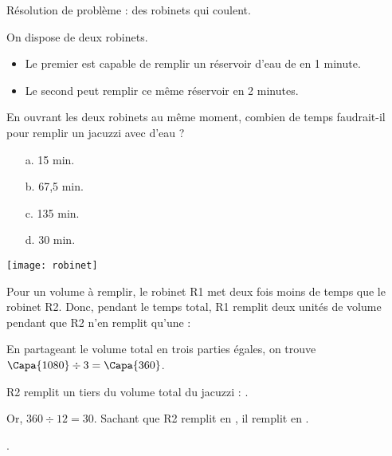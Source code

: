 \begin{Maquette}[Fiche,CorrigeFin,Colonnes=2]{}
\begin{multicols}{2}
      
      \begin{exercice}[Dur] %
         Résolution de problème : des robinets qui coulent. \par
         On dispose de deux robinets.
         \begin{itemize}
            \item Le premier est capable de remplir un réservoir d’eau de  en 1 minute.
            \item Le second peut remplir ce même réservoir en 2 minutes.
         \end{itemize}
         En ouvrant les deux robinets au même moment, combien de temps faudrait-il pour remplir un jacuzzi avec  d’eau ? \par
         \begin{minipage}{4cm}
            \begin{enumerate}
               \item[a.] 15 min.
               \item[b.] 67,5 min.
               \item[c.] 135 min.
               \item[d.] 30 min.
            \end{enumerate}
         \end{minipage}
         \begin{minipage}{2cm}
            \texttt{[image: robinet]}
         \end{minipage}
      \end{exercice}
      
      \begin{Solution}
         Pour un volume à remplir, le robinet R1 met deux fois moins de temps que le robinet R2. Donc, pendant le temps total, R1 remplit deux \og unités de volume \fg{} pendant que R2 n'en remplit qu’une : \par \smallskip
          \par
         En partageant le volume total en trois parties égales, on trouve $\Capa{1080}\div3 =\Capa{360}$. \par
         R2 remplit un tiers du volume total du jacuzzi : . \par
         Or, $360\div12 =30$. Sachant que R2 remplit  en , il remplit  en . \par
         .
      \end{Solution}

   \end{multicols}

\end{Maquette}


